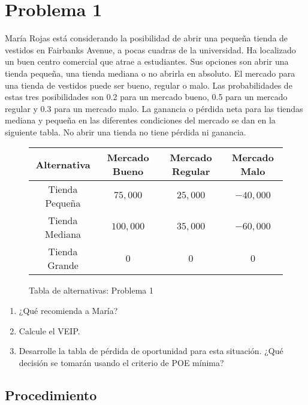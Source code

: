 \documentclass{article}
\begin{document}
    \section{Problema 1}

        María Rojas está considerando la posibilidad de abrir una pequeña tienda de vestidos en Fairbanks Avenue,  a pocas cuadras de la universidad. Ha localizado un buen centro comercial que atrae a estudiantes. Sus opciones son abrir una tienda pequeña, una tienda mediana o no abrirla en absoluto. El mercado para una tienda de vestidos puede ser bueno, regular o malo. Las probabilidades de estas tres posibilidades son 0.2 para un mercado bueno, 0.5 para un mercado regular y 0.3 para un mercado malo. La ganancia o pérdida neta para las tiendas mediana y pequeña en las diferentes condiciones del mercado se dan en la siguiente tabla. No abrir una tienda no tiene pérdida ni ganancia.

        \begin{figure}[!htbp]
            \centering
            \begin{tabular}{ |cccc| }
                \hline
                Alternativa & Mercado Bueno & Mercado Regular & Mercado Malo \\
                \hline
                Tienda Pequeña & $75,000$ & $25,000$ & $-40,000$ \\
                \hline
                Tienda Mediana & $100,000$ & $35,000$ & $-60,000$ \\
                \hline
                Tienda Grande & $0$ & $0$ & $0$ \\
                \hline
            \end{tabular}
            \caption{Tabla de alternativas: Problema 1}
            \label{tabla:problema1}
        \end{figure}

        \begin{enumerate}
            \item ¿Qué recomienda a María?
            \item Calcule el VEIP.
            \item Desarrolle la tabla de pérdida de oportunidad para esta situación. ¿Qué decisión se tomarán usando  el criterio de POE mínima?
        \end{enumerate}

        \subsection{Procedimiento}
\end{document}
